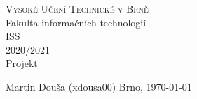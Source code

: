 \documentclass{article}
\begin{document}
\clearpage
\begin{titlepage}
	\begin{center}
		\textsc{\LARGE Vysoké Učení Technické v Brně}\\[0.5cm]
		{\LARGE Fakulta informačních technologií }\\[4.0cm]

		\textsc{\LARGE ISS}\\[0.5cm]
		\textsc{\LARGE 2020/2021}\\[3.5cm]

		{\LARGE Projekt}\\[1.0cm]
	\end{center}

	\vfill 

	\begin{flushleft} 
		\large
		Martin Douša (xdousa00)
		\hfill
		Brno, \today
	\end{flushleft}
\end{titlepage}
\thispagestyle{empty}

\newpage
\tableofcontents

\newpage
\listoffigures

\newpage













\end{document}
